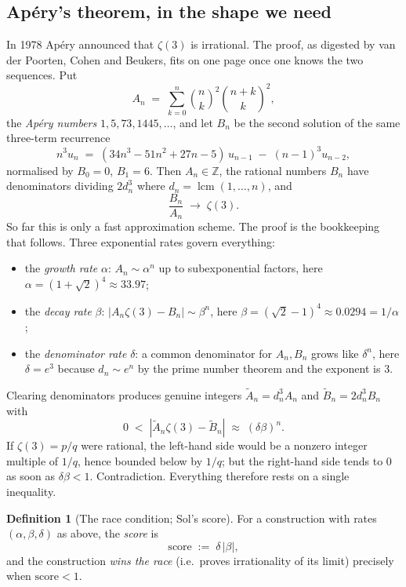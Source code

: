 \documentclass[11pt,reqno]{amsart}
\theoremstyle{plain}
\theoremstyle{definition}
\newtheorem{definition}[theorem]{Definition}
\theoremstyle{remark}
\newcommand{\Z}{\mathbb{Z}}
\newcommand{\dn}{d_n}
\begin{document}
\subsection{Ap\'ery's theorem, in the shape we need}

In 1978 Ap\'ery announced that $\zeta(3)$ is irrational. The proof, as
digested by van der Poorten, Cohen and Beukers, fits on one page once one
knows the two sequences. Put
\[
  A_n \;=\; \sum_{k=0}^n \binom{n}{k}^2\binom{n+k}{k}^2,
\]
the \emph{Ap\'ery numbers} $1,5,73,1445,\dots$, and let $B_n$ be the
second solution of the same three-term recurrence
\begin{equation}
\label{eq:aperyrec}
  n^3 u_n \;=\; (34n^3-51n^2+27n-5)\,u_{n-1}\;-\;(n-1)^3u_{n-2},
\end{equation}
normalised by $B_0=0$, $B_1=6$. Then $A_n\in\Z$, the rational numbers
$B_n$ have denominators dividing $2\dn^3$ where
$\dn=\operatorname{lcm}(1,\dots,n)$, and
\[
  \frac{B_n}{A_n}\;\longrightarrow\;\zeta(3).
\]
So far this is only a fast approximation scheme. The proof is the
bookkeeping that follows. Three exponential rates govern everything:

\begin{itemize}[leftmargin=1.4em]
\item the \emph{growth rate} $\alpha$: $A_n\sim \alpha^n$ up to
  subexponential factors, here $\alpha=(1+\sqrt2)^4\approx 33.97$;
\item the \emph{decay rate} $\beta$: $|A_n\zeta(3)-B_n|\sim\beta^n$, here
  $\beta=(\sqrt2-1)^4\approx 0.0294=1/\alpha$;
\item the \emph{denominator rate} $\delta$: a common denominator for
  $A_n,B_n$ grows like $\delta^n$, here $\delta=e^3$ because
  $\dn\sim e^n$ by the prime number theorem and the exponent is $3$.
\end{itemize}

Clearing denominators produces genuine integers $\tilde A_n=\dn^3A_n$ and
$\tilde B_n = 2\dn^3B_n$ with
\[
  0\;<\;|\tilde A_n\zeta(3)-\tilde B_n|\;\approx\;(\delta\beta)^n .
\]
If $\zeta(3)=p/q$ were rational, the left-hand side would be a nonzero
integer multiple of $1/q$, hence bounded below by $1/q$; but the
right-hand side tends to $0$ as soon as $\delta\beta<1$. Contradiction.
Everything therefore rests on a single inequality.

\begin{definition}[The race condition; Sol's score]
\label{def:score}
For a construction with rates $(\alpha,\beta,\delta)$ as above, the
\emph{score} is
\[
  \mathrm{score} \;:=\; \delta\,|\beta| ,
\]
and the construction \emph{wins the race} (i.e.\ proves irrationality of
its limit) precisely when $\mathrm{score}<1$.
\end{definition}
\end{document}
